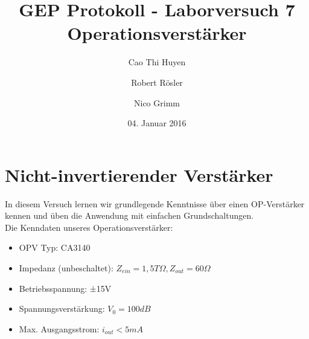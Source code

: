 \documentclass[11pt,a4paper,titlepage]{article}
\begin{document}
\title{GEP Protokoll - Laborversuch 7\\[1ex]
Operationsverst\"arker}
\author{Cao Thi Huyen \and Robert R\"osler \and Nico Grimm}
\date{04. Januar 2016}

\maketitle

\section{Nicht-invertierender Verst\"arker}
In diesem Versuch lernen wir grundlegende Kenntnisse \"uber einen OP-Verst\"arker kennen und \"uben die Anwendung mit einfachen Grundschaltungen. \\[1ex]
Die Kenndaten unseres Operationsverst\"arker:
\begin{itemize}
\item OPV Typ: CA3140
\item Impedanz (unbeschaltet): $Z_{ein}=1,5T\Omega, Z_{out}=60\Omega$
\item Betriebsspannung: ±15V
\item Spannungsverst\"arkung: $V_0=100dB$
\item Max. Ausgangsstrom: $i_{out}<5mA$
\end{itemize}

\end{document}
